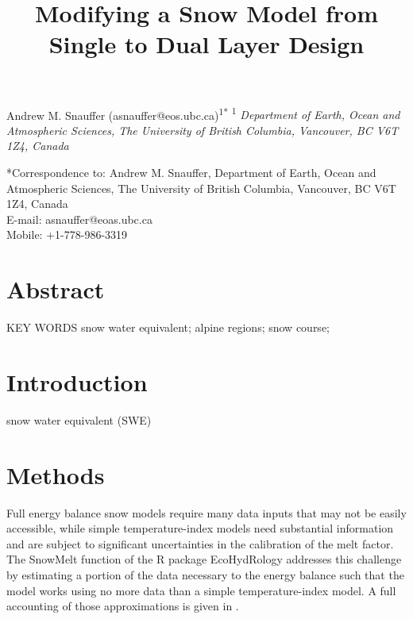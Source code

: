 \documentclass[12pt]{article}
\title{Modifying a Snow Model from Single to Dual Layer Design}
\author{}
\date{}
\begin{document}
\maketitle
\begin{center}
Andrew M. Snauffer (asnauffer@eos.ubc.ca)\textsuperscript{1*}
\newline
\newline
\footnotesize{
\textsuperscript{1}\textit{
Department of Earth, Ocean and Atmospheric Sciences,
The University of British Columbia,
Vancouver, BC V6T 1Z4,
Canada}
}
\end{center}

\begin{footnotesize}
\noindent
*Correspondence to: Andrew M. Snauffer, 
Department of Earth, Ocean and Atmospheric Sciences,
The University of British Columbia,
Vancouver, BC V6T 1Z4,
Canada
\\E-mail: asnauffer@eoas.ubc.ca
\\Mobile: +1-778-986-3319

\end{footnotesize}

\newpage

\section{Abstract}

\bigskip
\noindent KEY WORDS \: snow water equivalent; alpine regions; snow course; 

\section{Introduction}
snow water equivalent (SWE)

\section{Methods}
Full energy balance snow models require many data inputs that may not be easily accessible, while simple temperature-index models need substantial information and are subject to significant uncertainties in the calibration of the melt factor.
The SnowMelt function of the R package EcoHydRology \citep{fuka2014ecohydrology} addresses this challenge by estimating a portion of the data necessary to the energy balance such that the model works using no more data than a simple temperature-index model.
A full accounting of those approximations is given in \citet{walter2005process}.
\end{document}
